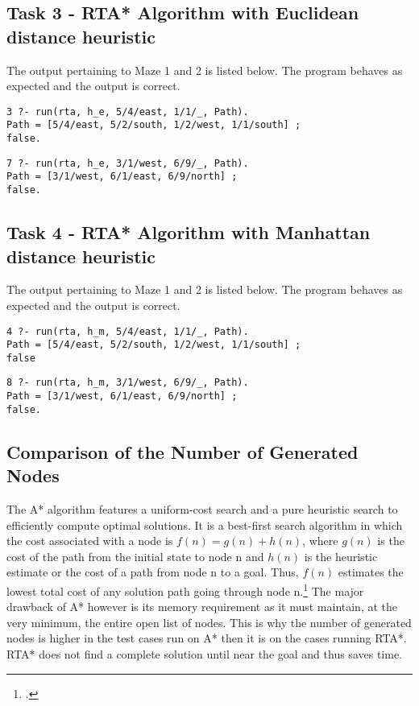 \documentclass[11pt]{article}
\newcommand{\forceindent}{\leavevmode{\parindent=1em\indent}}
\begin{document}
\subsection{Task 3 - RTA* Algorithm with Euclidean distance heuristic}
The output pertaining to Maze 1 and 2 is listed below. The program behaves as expected and the output is correct.	
\begin{lstlisting}
3 ?- run(rta, h_e, 5/4/east, 1/1/_, Path).
Path = [5/4/east, 5/2/south, 1/2/west, 1/1/south] ;
false.	
\end{lstlisting}
\vspace{2 mm}
\begin{lstlisting}
7 ?- run(rta, h_e, 3/1/west, 6/9/_, Path).
Path = [3/1/west, 6/1/east, 6/9/north] ;
false.
\end{lstlisting}
\subsection{Task 4 - RTA* Algorithm with Manhattan distance heuristic}
The output pertaining to Maze 1 and 2 is listed below. The program behaves as expected and the output is correct.	
\begin{lstlisting}
4 ?- run(rta, h_m, 5/4/east, 1/1/_, Path).
Path = [5/4/east, 5/2/south, 1/2/west, 1/1/south] ;
false	
\end{lstlisting}
\vspace{2 mm}
\begin{lstlisting}
8 ?- run(rta, h_m, 3/1/west, 6/9/_, Path).
Path = [3/1/west, 6/1/east, 6/9/north] ;
false.	
\end{lstlisting}
\subsection{Comparison of the Number of Generated Nodes}

\forceindent The A* algorithm features a uniform-cost search and a pure heuristic search to efficiently compute optimal solutions. It is a best-first search algorithm in which the cost associated with a node is $f(n) = g(n) + h(n)$, where $g(n)$ is the cost of the path from the initial state to node n and $h(n)$ is the heuristic estimate or the cost of a path from node n to a goal. Thus, $f(n)$ estimates the lowest total cost of any solution path going through node n.\footcite{astar} The major drawback of A* however is its memory requirement as it must maintain, at the very minimum, the entire open list of nodes. This is why the number of generated nodes is higher in the test cases run on A* then it is on the cases running RTA*. RTA* does not find a complete solution until near the goal and thus saves time. \\
\end{document}
